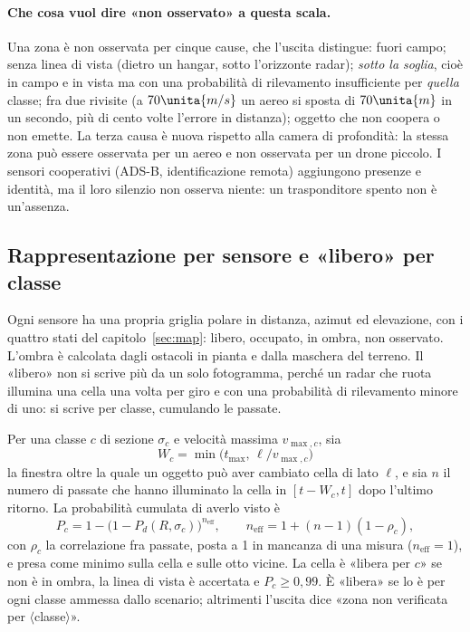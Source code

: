 \paragraph{Che cosa vuol dire «non osservato» a questa scala.} Una zona è non osservata per cinque cause, che l'uscita distingue: fuori campo; senza linea di vista (dietro un hangar, sotto l'orizzonte radar); \emph{sotto la soglia}, cioè in campo e in vista ma con una probabilità di rilevamento insufficiente per \emph{quella} classe; fra due rivisite (a $70\unita{m/s}$ un aereo si sposta di $70\unita{m}$ in un secondo, più di cento volte l'errore in distanza); oggetto che non coopera o non emette. La terza causa è nuova rispetto alla camera di profondità: la stessa zona può essere osservata per un aereo e non osservata per un drone piccolo. I sensori cooperativi (ADS-B, identificazione remota) aggiungono presenze e identità, ma il loro silenzio non osserva niente: un trasponditore spento non è un'assenza.

\subsection{Rappresentazione per sensore e «libero» per classe}\label{sec:lp-libero}

Ogni sensore ha una propria griglia polare in distanza, azimut ed elevazione, con i quattro stati del capitolo~\ref{sec:map}: libero, occupato, in ombra, non osservato. L'ombra è calcolata dagli ostacoli in pianta e dalla maschera del terreno. Il «libero» non si scrive più da un solo fotogramma, perché un radar che ruota illumina una cella una volta per giro e con una probabilità di rilevamento minore di uno: si scrive per classe, cumulando le passate.

\begin{definizione}\label{def:lp-libero}
Per una classe $c$ di sezione $\sigma_c$ e velocità massima $v_{\max,c}$, sia
\[W_c=\min\bigl(t_{\max},\,\ell/v_{\max,c}\bigr)\]
la finestra oltre la quale un oggetto può aver cambiato cella di lato $\ell$, e sia $n$ il numero di passate che hanno illuminato la cella in $[t-W_c,t]$ dopo l'ultimo ritorno. La probabilità cumulata di averlo visto è
\[
P_{c}=1-\bigl(1-P_d(R,\sigma_c)\bigr)^{n_{\mathrm{eff}}},\qquad n_{\mathrm{eff}}=1+(n-1)(1-\rho_c),
\]
con $\rho_c$ la correlazione fra passate, posta a 1 in mancanza di una misura ($n_{\mathrm{eff}}=1$), e presa come minimo sulla cella e sulle otto vicine. La cella è «libera per $c$» se non è in ombra, la linea di vista è accertata e $P_c\ge0{,}99$. È «libera» se lo è per ogni classe ammessa dallo scenario; altrimenti l'uscita dice «zona non verificata per $\langle$classe$\rangle$».
\end{definizione}

